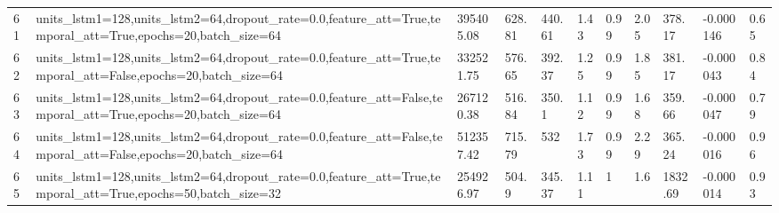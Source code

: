 \begin{longtable}{C{0.8cm} L{2cm} C{1.15cm} C{1.15cm} C{1.15cm} C{1.15cm} C{0.85cm} C{1.25cm} C{1.2cm} C{1.5cm} C{1.0cm}}
61 & units\_lstm1=128,\newline units\_lstm2=64,\newline dropout\_rate=0.0,\newline feature\_att=True,\newline temporal\_att=True,\newline epochs=20,\newline batch\_size=64 & 395405.08 & 628.81 & 440.61 & 1.43 & 0.99 & 2.05 & 378.17 & -0.000146 & 0.65 \\
62 & units\_lstm1=128,\newline units\_lstm2=64,\newline dropout\_rate=0.0,\newline feature\_att=True,\newline temporal\_att=False,\newline epochs=20,\newline batch\_size=64 & 332521.75 & 576.65 & 392.37 & 1.25 & 0.99 & 1.85 & 381.17 & -0.000043 & 0.84 \\
63 & units\_lstm1=128,\newline units\_lstm2=64,\newline dropout\_rate=0.0,\newline feature\_att=False,\newline temporal\_att=True,\newline epochs=20,\newline batch\_size=64 & 267120.38 & 516.84 & 350.1 & 1.12 & 0.99 & 1.68 & 359.66 & -0.000047 & 0.79 \\
64 & units\_lstm1=128,\newline units\_lstm2=64,\newline dropout\_rate=0.0,\newline feature\_att=False,\newline temporal\_att=False,\newline epochs=20,\newline batch\_size=64 & 512357.42 & 715.79 & 532 & 1.73 & 0.99 & 2.29 & 365.24 & -0.000016 & 0.96 \\
65 & units\_lstm1=128,\newline units\_lstm2=64,\newline dropout\_rate=0.0,\newline feature\_att=True,\newline temporal\_att=True,\newline epochs=50,\newline batch\_size=32 & 254926.97 & 504.9 & 345.37 & 1.11 & 1 & 1.6 & 1832.69 & -0.000014 & 0.93 \\

\end{longtable}
